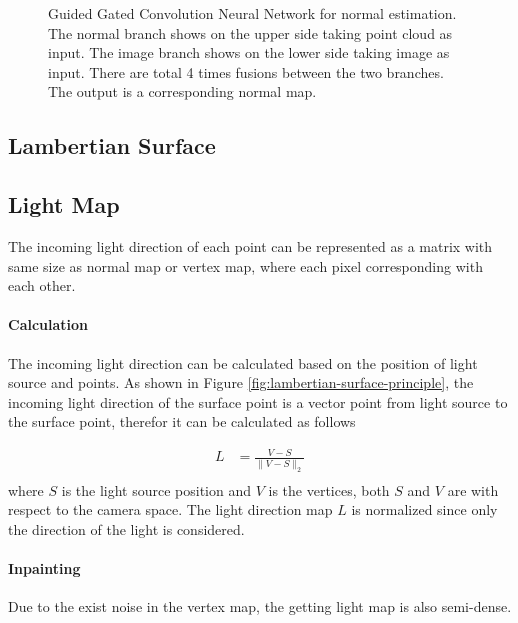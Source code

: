 \begin{figure}[th]
\begin{tikzpicture}
	\end{tikzpicture}
	
	\caption{Guided Gated Convolution Neural Network for normal estimation. The normal branch shows on the upper side taking point cloud as input. The image branch shows on the lower side taking image as input. There are total 4 times fusions between the two branches. The output is a corresponding normal map.}
	\label{fig:ng-archi}
\end{figure}


\subsection{Lambertian Surface}


\subsection{Light Map}
The incoming light direction of each point can be represented as a matrix with same size as normal map or vertex map, where each pixel corresponding with each other.

\paragraph{Calculation}
The incoming light direction can be calculated based on the position of light source and points. As shown in Figure \ref{fig:lambertian-surface-principle}, the incoming light direction of the surface point is a vector point from light source to the surface point, therefor it can be calculated as follows

\begin{equation}\label{light-direction}
	\begin{array}{ll}
		L&= \frac{V-S}{\|V-S\|_2}\\ 
	\end{array}
\end{equation}
where $ S $ is the light source position and $ V $ is the vertices, both $ S $ and  $ V $ are with respect to the camera space. The light direction map $ L $ is normalized since only the direction of the light is considered. 

\paragraph{Inpainting}
Due to the exist noise in the vertex map, the getting light map is also semi-dense.

